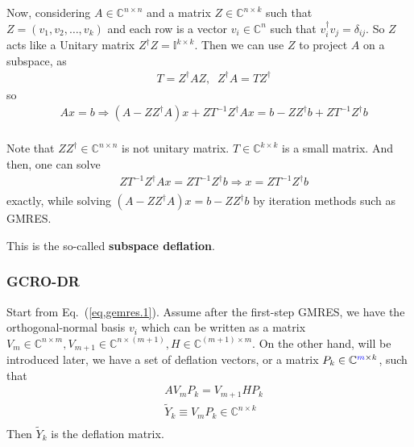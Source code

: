 Now, considering $A\in \mathbb{C}^{n\times n}$ and a matrix $Z\in \mathbb{C}^{n\times k}$ such that $Z=(v_1,v_2,\ldots,v_k)$ and each row is a vector $v_i\in \mathbb{C}^n$ such that $v_i^{\dagger}v_j=\delta _{ij}$. So $Z$ acts like a Unitary matrix $Z^{\dagger}Z=\mathbb{I}^{k\times k}$. Then we can use $Z$ to project $A$ on a subspace, as
\begin{equation}
\begin{split}
&T=Z^{\dagger}AZ,\;\;Z^{\dagger}A=TZ^{\dagger}
\end{split}
\end{equation}
so
\begin{equation}
\begin{split}
&Ax=b \Rightarrow \left(A-ZZ^{\dagger}A\right)x+ZT^{-1}Z^{\dagger}Ax=b-ZZ^{\dagger}b + ZT^{-1}Z^{\dagger}b\\
\end{split}
\end{equation}

Note that $ZZ^{\dagger}\in \mathbb{C}^{n\times n}$ is not unitary matrix. $T\in \mathbb{C}^{k\times k}$ is a small matrix. And then, one can solve
\begin{equation}
\begin{split}
&ZT^{-1}Z^{\dagger}Ax=ZT^{-1}Z^{\dagger}b \Rightarrow x=ZT^{-1}Z^{\dagger}b\\
\end{split}
\end{equation}
exactly, while solving $\left(A-ZZ^{\dagger}A\right)x=b-ZZ^{\dagger}b$ by iteration methods such as GMRES.

This is the so-called \textbf{subspace deflation}.

\subsubsection{\label{sec:gcrodr}GCRO-DR}

Start from Eq.~(\ref{eq,gemres.1}). Assume after the first-step GMRES, we have the orthogonal-normal basis $v_i$ which can be written as a matrix $V_m\in \mathbb{C}^{n\times m},V_{m+1}\in \mathbb{C}^{n\times (m+1)},H\in \mathbb{C}^{(m+1)\times m}$. On the other hand, will be introduced later, we have a set of deflation vectors, or a matrix $P_k\in \mathbb{C}^{\textcolor[rgb]{0,0,1}{m}\times k}$, such that
\begin{equation}
\begin{split}
&AV_mP_k=V_{m+1}HP_k\\
&\tilde {Y}_k\equiv V_mP_k \in \mathbb{C}^{n\times k}\\
\end{split}
\end{equation}
Then $\tilde {Y}_k$ is the deflation matrix.

